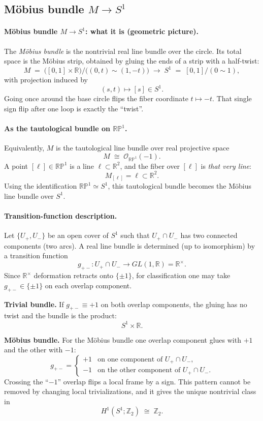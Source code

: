 \documentclass[12pt,a4paper]{article}
\theoremstyle{plain}
\theoremstyle{definition}      %
\begin{document}
\subsection*{Möbius bundle $M\to S^1$}

\paragraph{Möbius bundle $M\to S^1$: what it is (geometric picture).}
The \emph{Möbius bundle} is the nontrivial real line bundle over the circle.
Its total space is the Möbius strip, obtained by gluing the ends of a strip
with a half-twist:
\[
M \;=\;\bigl([0,1]\times \mathbb{R}\bigr)\Big/\bigl((0,t)\sim(1,-t)\bigr)
\;\longrightarrow\;
S^1 \;=\; [0,1]/(0\sim 1),
\]
with projection induced by
\[
(s,t)\longmapsto [s]\in S^1.
\]
Going once around the base circle flips the fiber coordinate $t\mapsto -t$.
That single sign flip after one loop is exactly the ``twist''.

\paragraph{As the tautological bundle on $\mathbb{RP}^1$.}
Equivalently, $M$ is the tautological line bundle over real projective space
\[
M \;\cong\; \mathcal{O}_{\mathbb{RP}^1}(-1).
\]
A point $[\ell]\in \mathbb{RP}^1$ is a line $\ell\subset \mathbb{R}^2$, and the
fiber over $[\ell]$ is \emph{that very line}:
\[
M_{[\ell]}=\ell\subset \mathbb{R}^2.
\]
Using the identification $\mathbb{RP}^1\simeq S^1$, this tautological bundle
becomes the Möbius line bundle over $S^1$.

\paragraph{Transition-function description.}
Let $\{U_+,U_-\}$ be an open cover of $S^1$ such that
$U_+\cap U_-$ has two connected components (two arcs). A real line bundle is
determined (up to isomorphism) by a transition function
\[
g_{+-}:U_+\cap U_- \longrightarrow GL(1,\mathbb{R})=\mathbb{R}^\times.
\]
Since $\mathbb{R}^\times$ deformation retracts onto $\{\pm 1\}$, for
classification one may take $g_{+-}\in\{\pm 1\}$ on each overlap component.

\medskip
\noindent\textbf{Trivial bundle.}
If $g_{+-}\equiv +1$ on both overlap components, the gluing has no twist and
the bundle is the product:
\[
S^1\times \mathbb{R}.
\]

\medskip
\noindent\textbf{Möbius bundle.}
For the Möbius bundle one overlap component glues with $+1$ and the other with
$-1$:
\[
g_{+-}=
\begin{cases}
	+1 & \text{on one component of }U_+\cap U_-,\\
	-1 & \text{on the other component of }U_+\cap U_-.
\end{cases}
\]
Crossing the ``$-1$'' overlap flips a local frame by a sign. This pattern cannot
be removed by changing local trivializations, and it gives the unique nontrivial
class in
\[
H^1(S^1;\mathbb{Z}_2)\;\cong\;\mathbb{Z}_2.
\]
\end{document}
